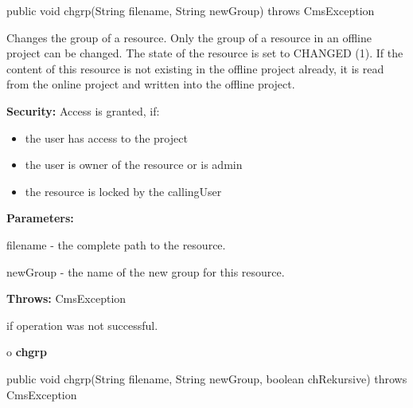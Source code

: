 \begin{PRE}
 public void chgrp(String filename,
                   String newGroup) throws CmsException
\end{PRE}

\begin{description}
\htmlDD Changes the group of a resource. \htmlBR
Only the group of a resource in an offline project can be changed. The state
of the resource is set to CHANGED (1). If the content of this resource is not
existing in the offline project already, it is read from the online project
and written into the offline project. 

{\bf Security:} Access is granted, if: 

\begin{itemize}
\item the user has access to the project 
\item the user is owner of the resource or is admin 
\item the resource is locked by the callingUser 
\end{itemize}

\begin{description}
\item {\bf Parameters:}  

filename - the complete path to the resource.  

newGroup - the name of the new group for this resource.  
\item {\bf Throws:} CmsException  

if operation was not successful.  
\end{description}

\end{description}

o {\bf chgrp} 

\begin{PRE}
 public void chgrp(String filename,
                   String newGroup,
                   boolean chRekursive) throws CmsException
\end{PRE}

